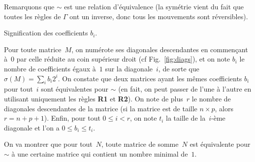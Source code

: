 Remarquons que $\sim$ est une relation d'équivalence (la symétrie vient du fait que toutes les règles de $\Gamma$ ont un inverse, donc tous les mouvements sont réversibles).



\begin{floatingfigure}[r]{.5\textwidth}
\centering


\caption{Signification des coefficients $b_i$.}
\label{fig:diags}
\end{floatingfigure}
Pour toute  matrice~$M$, on numérote  ses diagonales descendantes  en commençant
à~$0$ par celle réduite au coin supérieur droit (cf Fig.~\ref{fig:diags}), et on
note $b_i$ le nombre de coefficients  égaux à~$1$ sur la diagonale~$i$, de sorte
que \linebreak  \mbox{$\sigma (M) = \sum\limits_ib_i2^i$}. On  constate que deux
matrices  ayant  les mêmes  coefficients  $b_i$  pour  \linebreak tout~$i$  sont
équivalentes  pour  $\sim$ (en  fait,  on  peut passer  de  l'une  à l'autre  en
utilisant uniquement les règles \textbf{R1} et \textbf{R2}). On note de plus~$r$
le nombre de diagonales descendantes de  la matrice (si la matrice est de taille
$n\times p$, alors $r  = n+p+1$). Enfin, pour tout $0\leq i  < r$, on note $t_i$
la taille de la~$i$-ème diagonale et l'on a $0\leq b_i \leq t_i$.
 
On va montrer que pour tout~$N$, toute matrice de somme~$N$ est équivalente pour $\sim$ à une certaine matrice qui contient un nombre minimal de~$1$.

